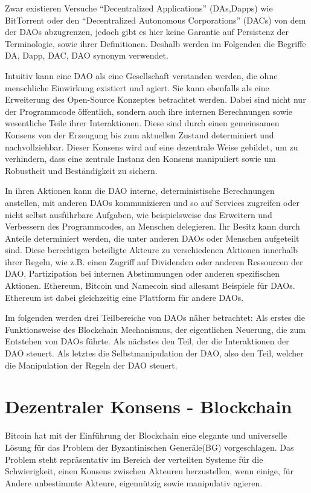 \documentclass[a4paper,12pt]{report}
\begin{document}
Zwar existieren Versuche ``Decentralized Applications'' (DAs,Dapps) wie BitTorrent oder den ``Decentralized Autonomous Corporations'' (DACs) von dem der DAOs abzugrenzen, jedoch gibt es hier keine Garantie auf Persistenz der Terminologie, sowie ihrer Definitionen. Deshalb werden im Folgenden die Begriffe DA, Dapp, DAC, DAO synonym verwendet.

Intuitiv kann eine DAO als eine Gesellschaft verstanden werden, die ohne menschliche Einwirkung existiert und agiert. Sie kann ebenfalls als eine Erweiterung des Open-Source Konzeptes betrachtet werden. Dabei sind nicht nur der Programmcode öffentlich, sondern auch ihre internen Berechnungen sowie wesentliche Teile ihrer Interaktionen. Diese sind durch einen gemeinsamen Konsens von der Erzeugung bis zum aktuellen Zustand determiniert und nachvollziehbar. Dieser Konsens wird auf eine dezentrale Weise gebildet, um zu verhindern, dass eine zentrale Instanz den Konsens manipuliert sowie um Robustheit und Beständigkeit zu sichern.

In ihren Aktionen kann die DAO interne, deterministische Berechnungen anstellen, mit anderen DAOs kommunizieren und so auf Services zugreifen oder nicht selbst ausführbare Aufgaben, wie beispielsweise das Erweitern und Verbessern des Programmcodes, an Menschen delegieren. Ihr Besitz kann durch Anteile determiniert werden, die unter anderen DAOs oder Menschen aufgeteilt sind. Diese berechtigen beteiligte Akteure zu verschiedenen Aktionen innerhalb ihrer Regeln, wie z.B. einen Zugriff auf Dividenden oder anderen Ressourcen der DAO, Partizipation bei internen Abstimmungen oder anderen spezifischen Aktionen. Ethereum, Bitcoin und Namecoin sind allesamt Beispiele für DAOs. Ethereum ist dabei gleichzeitig eine Plattform für andere DAOs.

Im folgenden werden drei Teilbereiche von DAOs näher betrachtet: Als erstes die Funktionsweise des Blockchain Mechanismus, der eigentlichen Neuerung, die zum Entstehen von DAOs führte. Als nächstes den Teil, der die Interaktionen der DAO steuert. Als letztes die Selbstmanipulation der DAO, also den Teil, welcher die Manipulation der Regeln der DAO steuert.


\section{Dezentraler Konsens - Blockchain}
\label{blockchain}

Bitcoin hat mit der Einführung der Blockchain eine elegante und universelle Lösung für das Problem der Byzantinischen Generäle(BG) vorgeschlagen. Das Problem steht repräsentativ im Bereich der verteilten Systeme für die Schwierigkeit, einen Konsens zwischen Akteuren herzustellen, wenn einige, für Andere unbestimmte Akteure, eigennützig sowie manipulativ agieren. 
\end{document}
